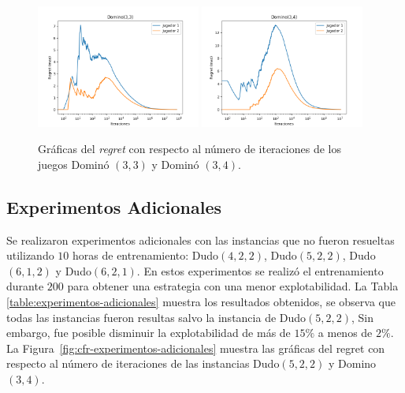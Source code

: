 \begin{figure}[h]
    \centering
    \includegraphics[width=0.48\textwidth]{graficas/cfr/domino/Domino(3,3).png}
    \includegraphics[width=0.48\textwidth]{graficas/cfr/domino/Domino(3,4).png}
    \caption{Gráficas del \textit{regret} con respecto al número de iteraciones de los juegos Dominó $(3, 3)$ y Dominó $(3, 4)$.}
    \label{fig:cfr-regret-domino}
\end{figure}

\subsection*{Experimentos Adicionales}

Se realizaron experimentos adicionales con las instancias que no fueron resueltas utilizando $10$ horas de entrenamiento: Dudo$(4,2,2)$, Dudo$(5,2,2)$, Dudo$(6,1,2)$ y Dudo$(6,2,1)$. En estos experimentos se realizó el entrenamiento durante $200$ para obtener una estrategia con una menor explotabilidad.  La Tabla \ref{table:experimentos-adicionales} muestra los resultados obtenidos, se observa que todas las instancias fueron resultas salvo la instancia de Dudo$(5, 2, 2)$, Sin embargo, fue posible disminuir la explotabilidad de más de $15\%$ a menos de $2\%$. La Figura~\ref{fig:cfr-experimentos-adicionales} muestra las gráficas del regret con respecto al número de iteraciones de las instancias Dudo$(5,2,2)$ y Domino$(3, 4)$.

